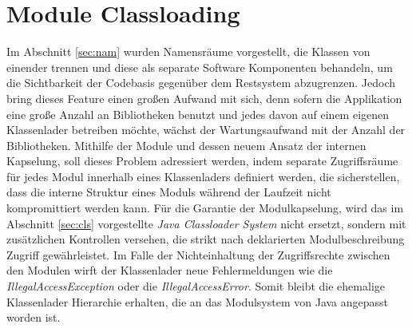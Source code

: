   \section{Module Classloading} \label{sec:mod-cll}
    Im Abschnitt \ref{sec:nam} wurden Namensräume vorgestellt, die Klassen von einender trennen und diese als separate Software Komponenten behandeln, um die Sichtbarkeit der Codebasis gegenüber dem Restsystem abzugrenzen. Jedoch bring dieses Feature einen großen Aufwand mit sich, denn sofern die Applikation eine große Anzahl an Bibliotheken benutzt und jedes davon auf einem eigenen Klassenlader betreiben möchte, wächst der Wartungsaufwand mit der Anzahl der Bibliotheken.\newline
    Mithilfe der Module und dessen neuem Ansatz der internen Kapselung, soll dieses Problem adressiert werden, indem separate Zugriffsräume für jedes Modul innerhalb eines Klassenladers definiert werden, die sicherstellen, dass die interne Struktur eines Moduls während der Laufzeit nicht kompromittiert werden kann.\newline
    Für die Garantie der Modulkapselung, wird das im Abschnitt \ref{sec:cls} vorgestellte \textit{Java Classloader System} nicht ersetzt, sondern mit zusätzlichen Kontrollen versehen, die strikt nach deklarierten Modulbeschreibung Zugriff gewährleistet. Im Falle der Nichteinhaltung der Zugriffsrechte zwischen den Modulen wirft der Klassenlader neue Fehlermeldungen wie die \textit{IllegalAccessException} oder die \textit{IllegalAccessError}. Somit bleibt die ehemalige Klassenlader Hierarchie erhalten, die an das Modulsystem von Java angepasst worden ist. \cite{classLoadingOracle, modulMitJava9}\bigbreak

